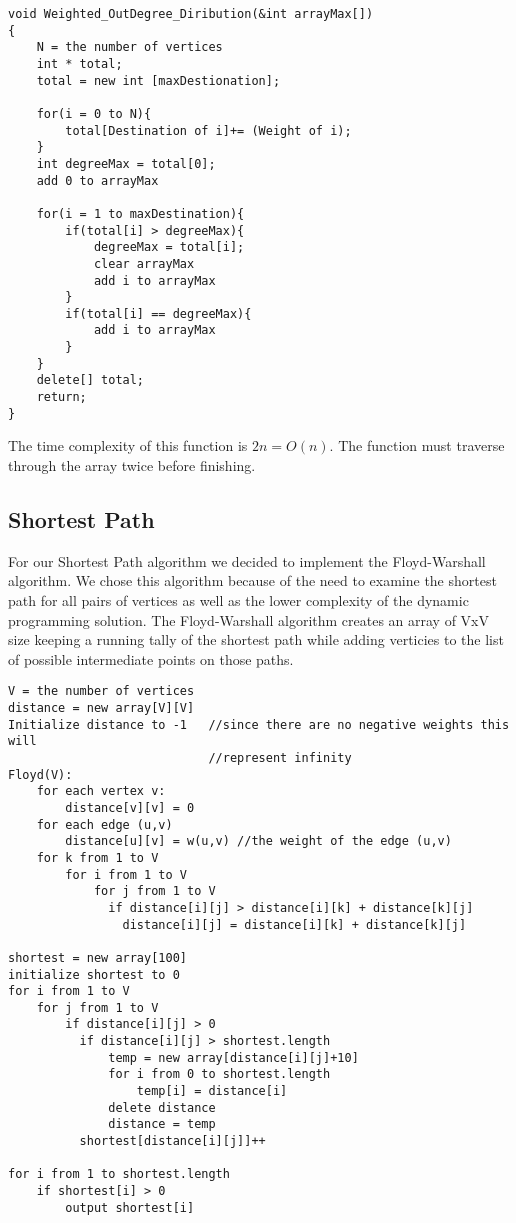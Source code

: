 \documentclass{article}
\begin{document}
\begin{verbatim}
void Weighted_OutDegree_Diribution(&int arrayMax[])
{
    N = the number of vertices
    int * total;
    total = new int [maxDestionation];

    for(i = 0 to N){
        total[Destination of i]+= (Weight of i);
    }
    int degreeMax = total[0];
    add 0 to arrayMax

    for(i = 1 to maxDestination){
        if(total[i] > degreeMax){
            degreeMax = total[i];
            clear arrayMax
            add i to arrayMax
        }
        if(total[i] == degreeMax){
            add i to arrayMax
        }
    }
    delete[] total;
    return;
}
\end{verbatim}

The time complexity of this function is $2n = O(n)$. The function must traverse through the array twice before finishing.

\subsection{Shortest Path}
For our Shortest Path algorithm we decided to implement the Floyd-Warshall algorithm. We chose this algorithm because of the need to examine the shortest path for all pairs of vertices as well as the lower complexity of the dynamic programming solution. The Floyd-Warshall algorithm creates an array of VxV size keeping a running tally of the shortest path while adding verticies to the list of possible intermediate points on those paths.

\begin{verbatim}
V = the number of vertices
distance = new array[V][V]
Initialize distance to -1   //since there are no negative weights this will
                            //represent infinity
Floyd(V):
    for each vertex v:
        distance[v][v] = 0
    for each edge (u,v)
        distance[u][v] = w(u,v) //the weight of the edge (u,v)
    for k from 1 to V
        for i from 1 to V
            for j from 1 to V
              if distance[i][j] > distance[i][k] + distance[k][j]
                distance[i][j] = distance[i][k] + distance[k][j]

shortest = new array[100]
initialize shortest to 0
for i from 1 to V
    for j from 1 to V
        if distance[i][j] > 0
          if distance[i][j] > shortest.length
              temp = new array[distance[i][j]+10]
              for i from 0 to shortest.length
                  temp[i] = distance[i]
              delete distance
              distance = temp
          shortest[distance[i][j]]++

for i from 1 to shortest.length
    if shortest[i] > 0
        output shortest[i]
\end{verbatim}
\end{document}
